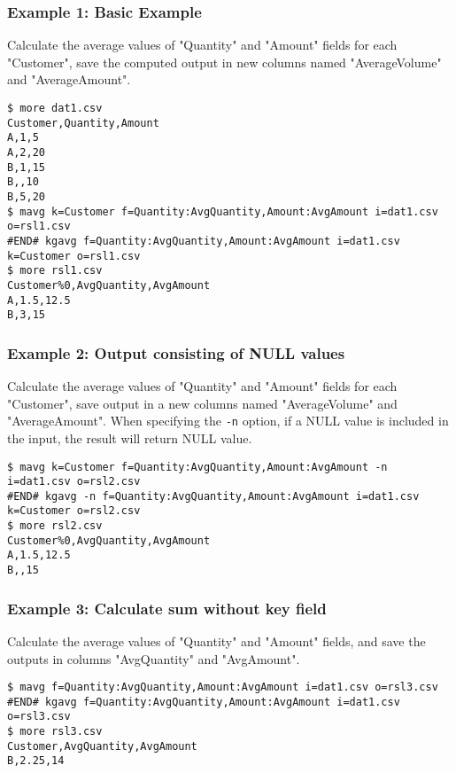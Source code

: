 \subsubsection*{Example 1: Basic Example}

Calculate the average values of "Quantity" and "Amount" fields for each "Customer", save the computed output in new columns named "AverageVolume" and "AverageAmount".


\begin{Verbatim}[baselinestretch=0.7,frame=single]
$ more dat1.csv
Customer,Quantity,Amount
A,1,5
A,2,20
B,1,15
B,,10
B,5,20
$ mavg k=Customer f=Quantity:AvgQuantity,Amount:AvgAmount i=dat1.csv o=rsl1.csv
#END# kgavg f=Quantity:AvgQuantity,Amount:AvgAmount i=dat1.csv k=Customer o=rsl1.csv
$ more rsl1.csv
Customer%0,AvgQuantity,AvgAmount
A,1.5,12.5
B,3,15
\end{Verbatim}
\subsubsection*{Example 2: Output consisting of NULL values}

Calculate the average values of "Quantity" and "Amount" fields for each "Customer", save output in a new columns named "AverageVolume" and "AverageAmount".
When specifying the \verb|-n| option, if a NULL value is included in the input, the result will return NULL value.



\begin{Verbatim}[baselinestretch=0.7,frame=single]
$ mavg k=Customer f=Quantity:AvgQuantity,Amount:AvgAmount -n i=dat1.csv o=rsl2.csv
#END# kgavg -n f=Quantity:AvgQuantity,Amount:AvgAmount i=dat1.csv k=Customer o=rsl2.csv
$ more rsl2.csv
Customer%0,AvgQuantity,AvgAmount
A,1.5,12.5
B,,15
\end{Verbatim}
\subsubsection*{Example 3: Calculate sum without key field}

Calculate the average values of "Quantity" and "Amount" fields, and save the outputs in columns "AvgQuantity" and "AvgAmount".


\begin{Verbatim}[baselinestretch=0.7,frame=single]
$ mavg f=Quantity:AvgQuantity,Amount:AvgAmount i=dat1.csv o=rsl3.csv
#END# kgavg f=Quantity:AvgQuantity,Amount:AvgAmount i=dat1.csv o=rsl3.csv
$ more rsl3.csv
Customer,AvgQuantity,AvgAmount
B,2.25,14
\end{Verbatim}
